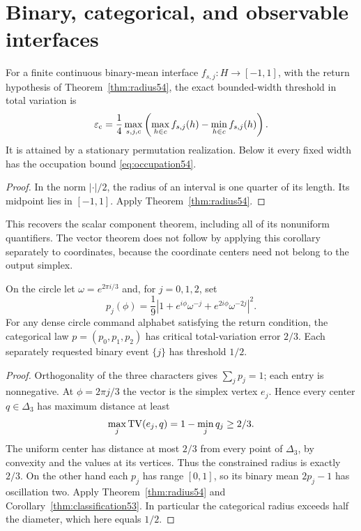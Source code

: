 \section{Binary, categorical, and observable interfaces}\label{sec:observable53}
\begin{corollary}\label{thm:classification53}
For a finite continuous binary-mean interface $f_{s,j}:H\to[-1,1]$, with the return hypothesis of Theorem~\ref{thm:radius54}, the exact bounded-width threshold in total variation is
\begin{equation}\label{eq:critical53}
 \varepsilon_{\mathrm c}=\frac14\max_{s,j,c}\left(\max_{h\in c}f_{s,j}(h)-\min_{h\in c}f_{s,j}(h)\right).
\end{equation}
It is attained by a stationary permutation realization. Below it every fixed width has the occupation bound \eqref{eq:occupation54}.
\end{corollary}
\begin{proof}
In the norm $|\cdot|/2$, the radius of an interval is one quarter of its length. Its midpoint lies in $[-1,1]$. Apply Theorem~\ref{thm:radius54}.
\end{proof}
This recovers the scalar component theorem, including all of its nonuniform quantifiers. The vector theorem does not follow by applying this corollary separately to coordinates, because the coordinate centers need not belong to the output simplex.

\begin{proposition}\label{prop:categorical54}
On the circle let $\omega=e^{2\pi i/3}$ and, for $j=0,1,2$, set
\[
 p_j(\phi)=\frac19\left|1+e^{i\phi}\omega^{-j}+e^{2i\phi}\omega^{-2j}\right|^2.
\]
For any dense circle command alphabet satisfying the return condition, the categorical law $p=(p_0,p_1,p_2)$ has critical total-variation error $2/3$. Each separately requested binary event $\{j\}$ has threshold $1/2$.
\end{proposition}
\begin{proof}
Orthogonality of the three characters gives $\sum_jp_j=1$; each entry is nonnegative. At $\phi=2\pi j/3$ the vector is the simplex vertex $e_j$. Hence every center $q\in\Delta_3$ has maximum distance at least
\[
 \max_j\operatorname{TV}(e_j,q)=1-\min_jq_j\ge2/3.
\]
The uniform center has distance at most $2/3$ from every point of $\Delta_3$, by convexity and the values at its vertices. Thus the constrained radius is exactly $2/3$. On the other hand each $p_j$ has range $[0,1]$, so its binary mean $2p_j-1$ has oscillation two. Apply Theorem~\ref{thm:radius54} and Corollary~\ref{thm:classification53}. In particular the categorical radius exceeds half the diameter, which here equals $1/2$.
\end{proof}

